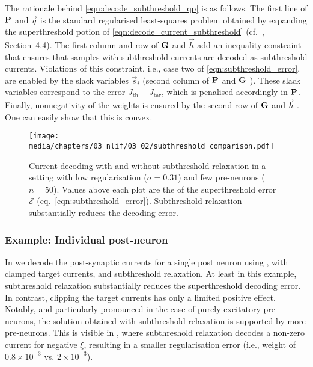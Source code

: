 The rationale behind \cref{eqn:decode_subthreshold_qp} is as follows.
The first line of $\mathbf{P}$ and $\vec q$
is the standard regularised least-squares problem obtained by expanding the superthreshold potion of \cref{eqn:decode_current_subthreshold} (cf.~\cite{boyd2004convex}, Section~4.4).
The first column and row of $\mathbf{G}$ and $\vec h$
add an inequality constraint that ensures that samples with subthreshold currents are decoded as subthreshold currents.
Violations of this constraint, i.e., case two of \cref{eqn:subthreshold_error}, are enabled by the slack variables $\vec s_i$ (second column of $\mathbf{P}$ and $\mathbf{G}$%
).
These slack variables correspond to the error $J_\mathrm{th} - J_\mathrm{tar}$, which is penalised accordingly in $\mathbf{P}$.
Finally, nonnegativity of the weights is ensured by the second row of $\mathbf{G}$ and $\vec h$%
. One can easily show that this \QP is convex.
\endgroup

\begin{figure}
	\texttt{[image: media/chapters/03\_nlif/03\_02/subthreshold\_comparison.pdf]}%
	{\label{fig:subthreshold_comparison_a}}%
	{\label{fig:subthreshold_comparison_b}}%
	{\label{fig:subthreshold_comparison_c}}%
	{\label{fig:subthreshold_comparison_d}}%
	\caption[Current decoding with and without subthreshold relaxation]{Current decoding with and without subthreshold relaxation in a setting with low regularisation ($\sigma = 0.31$) and few pre-neurons ($n = 50$).
	Values above each plot are the \RMS of the superthreshold error ${\mathcal{E}}$ (eq.~\ref{eqn:subthreshold_error}).
	Subthreshold relaxation substantially reduces the decoding error.	
	}
	\label{fig:subthreshold_comparison}
\end{figure}

\subsubsection{Example: Individual post-neuron}
In  we decode the post-synaptic currents for a single post neuron using \NNLS, \NNLS with clamped target currents, and subthreshold relaxation.
At least in this example, subthreshold relaxation substantially reduces the superthreshold decoding error.
In contrast, clipping the target currents has only a limited positive effect.
Notably, and particularly pronounced in the case of purely excitatory pre-neurons, the solution obtained with subthreshold relaxation is supported by more pre-neurons.
This is visible in , where subthreshold relaxation decodes a non-zero current for negative $\xi$, resulting in a smaller regularisation error (i.e., weight \RMS of $0.8 \times 10^{-3}$ vs. $2 \times{10}^{-3}$).

